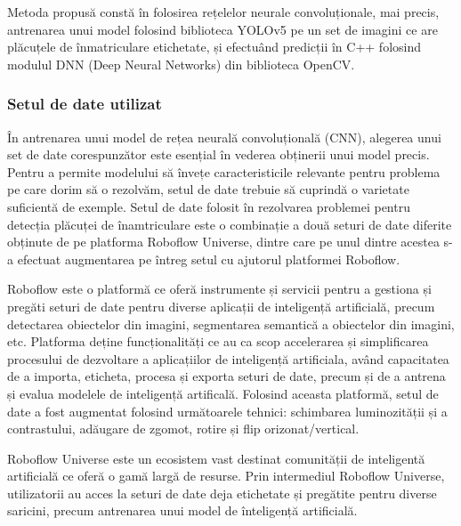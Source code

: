 \documentclass[12pt]{article}
\begin{document}
Metoda propus\u{a} const\u{a} \^{i}n folosirea rețelelor neurale convoluționale, mai precis, antrenarea unui model folosind biblioteca YOLOv5 pe un set de imagini ce are pl\u{a}cuțele de \^{i}nmatriculare etichetate, și efectu\^{a}nd predicții \^{i}n C++ folosind modulul DNN (Deep Neural Networks) din biblioteca OpenCV.


\subsubsection{Setul de date utilizat}

\^{I}n antrenarea unui model de rețea neural\u{a} convoluțional\u{a} (CNN), alegerea unui set de date corespunz\u{a}tor este esențial \^{i}n vederea obținerii unui model precis. Pentru a permite modelului s\u{a} \^{i}nvețe caracteristicile relevante pentru problema pe care dorim s\u{a} o rezolv\u{a}m, setul de date trebuie s\u{a} cuprind\u{a} o varietate suficient\u{a} de exemple. Setul de date folosit \^{i}n rezolvarea problemei pentru detecția pl\u{a}cuței de \^{i}namtriculare este o combinație a dou\u{a} seturi de date diferite obținute de pe platforma Roboflow Universe, dintre care pe unul dintre acestea s-a efectuat augmentarea pe \^{i}ntreg setul cu ajutorul platformei Roboflow.

Roboflow este o platform\u{a} ce ofer\u{a} instrumente și servicii pentru a gestiona și preg\u{a}ti seturi de date pentru diverse aplicații de inteligenț\u{a} artificial\u{a}, precum detectarea obiectelor din imagini, segmentarea semantic\u{a} a obiectelor din imagini, etc. Platforma deține funcționalit\u{a}ți ce au ca scop accelerarea și simplificarea procesului de dezvoltare a aplicațiilor de inteligenț\u{a} artificiala, av\^{a}nd capacitatea de a importa, eticheta, procesa și exporta seturi de date, precum și de a antrena și evalua modelele de inteligenț\u{a} artifical\u{a}. Folosind aceasta platform\u{a}, setul de date a fost augmentat folosind urm\u{a}toarele tehnici: schimbarea luminozit\u{a}ții și a contrastului, ad\u{a}ugare de zgomot, rotire și flip orizonat/vertical.

Roboflow Universe este un ecosistem vast destinat comunit\u{a}ții de inteligent\u{a} artificial\u{a} ce ofer\u{a} o gam\u{a} larg\u{a} de resurse. Prin intermediul Roboflow Universe, utilizatorii au acces la seturi de date deja etichetate și preg\u{a}tite pentru diverse saricini, precum antrenarea unui model de \^{i}nteligenț\u{a} artificial\u{a}.
\end{document}
